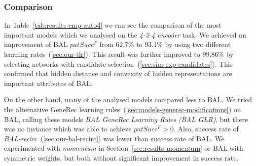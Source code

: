 
\subsubsection{Comparison} 
\label{sec:tlr-auto4-cmp} 

In Table~\ref{tab:results-cmp-auto4} we can see the comparison of the most important models which we analysed on the \emph{4-2-4 encoder} task. We achieved an improvement of BAL $patSucc^F$ from $62.7\%$ to $93.1\%$ by using two different learning rates~(\ref{sec:our-tlr}). This result was further improved to $99.86\%$ by selecting networks with candidate selection~(\ref{sec:sim-exp-candidates}). This confirmed that hidden distance and convexity of hidden representations are important attributes of BAL. 

On the other hand, many of the analysed models compared less to BAL. We tried the alternative GeneRec learning rules~(\ref{sec:models-generec-modifications}) on BAL, calling these models \emph{BAL GeneRec Learning Rules (BAL GLR)}, but there was no instance which was able to achieve $patSucc^F > 0$. Also, success rate of \emph{BAL-recirc}~(\ref{sec:our-bal-recirc}) was lower than success rate of BAL. We experimented with \emph{momentum} in Section~\ref{sec:results-momentum} or BAL with symmetric weights, but both without significant improvement in success rate.

